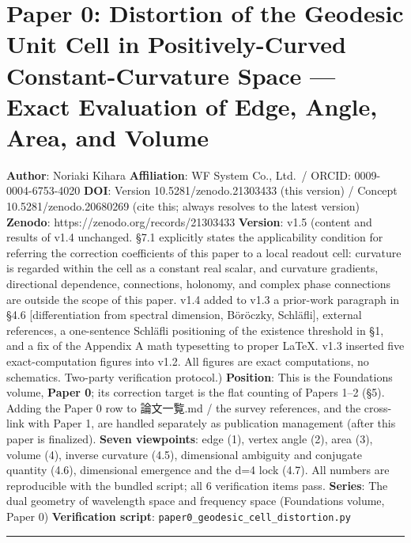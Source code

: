 \documentclass[
]{ltjsarticle}
\author{}
\date{}
\begin{document}
\section{Paper 0: Distortion of the Geodesic Unit Cell in
Positively-Curved Constant-Curvature Space --- Exact Evaluation of Edge,
Angle, Area, and
Volume}\label{paper-0-distortion-of-the-geodesic-unit-cell-in-positively-curved-constant-curvature-space-exact-evaluation-of-edge-angle-area-and-volume}

\textbf{Author}: Noriaki Kihara \textbf{Affiliation}: WF System Co.,
Ltd.~/ ORCID: 0009-0004-6753-4020 \textbf{DOI}: Version
10.5281/zenodo.21303433 (this version) / Concept 10.5281/zenodo.20680269
(cite this; always resolves to the latest version) \textbf{Zenodo}:
https://zenodo.org/records/21303433 \textbf{Version}: v1.5 (content and
results of v1.4 unchanged. §7.1 explicitly states the applicability
condition for referring the correction coefficients of this paper to a
local readout cell: curvature is regarded within the cell as a constant
real scalar, and curvature gradients, directional dependence,
connections, holonomy, and complex phase connections are outside the
scope of this paper. v1.4 added to v1.3 a prior-work paragraph in §4.6
{[}differentiation from spectral dimension, Böröczky, Schläfli{]},
external references, a one-sentence Schläfli positioning of the
existence threshold in §1, and a fix of the Appendix A math typesetting
to proper LaTeX. v1.3 inserted five exact-computation figures into v1.2.
All figures are exact computations, no schematics. Two-party
verification protocol.) \textbf{Position}: This is the Foundations
volume, \textbf{Paper 0}; its correction target is the flat counting of
Papers 1--2 (§5). Adding the Paper 0 row to 論文一覧.md / the survey
references, and the cross-link with Paper 1, are handled separately as
publication management (after this paper is finalized). \textbf{Seven
viewpoints}: edge (1), vertex angle (2), area (3), volume (4), inverse
curvature (4.5), dimensional ambiguity and conjugate quantity (4.6),
dimensional emergence and the d=4 lock (4.7). All numbers are
reproducible with the bundled script; all 6 verification items pass.
\textbf{Series}: The dual geometry of wavelength space and frequency
space (Foundations volume, Paper 0) \textbf{Verification script}:
\texttt{paper0\_geodesic\_cell\_distortion.py}

\begin{center}\rule{0.5\linewidth}{0.5pt}\end{center}
\end{document}
